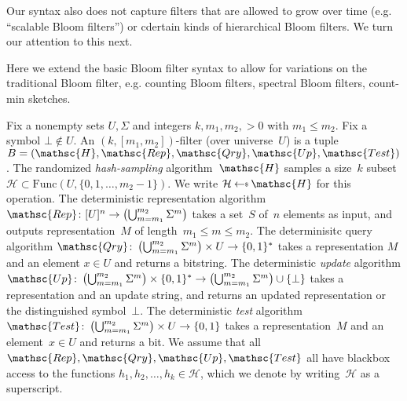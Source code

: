 Our syntax also does not capture filters that are allowed to grow over time (e.g. ``scalable Bloom filters'') or cdertain kinds of hierarchical Bloom filters.  We turn our attention to this next.


Here we extend the basic Bloom filter syntax to allow for variations on the traditional Bloom filter, e.g. counting Bloom filters, spectral Bloom filters, count-min sketches.  

Fix a nonempty sets $U,\Sigma$ and integers $k,m_1,m_2,>0$ with $m_1 \leq m_2$.  Fix a symbol $\bot \not\in U$.  An $(k,[m_1,m_2])$-filter (over universe~$U$) is a tuple  $B=(\mathsc{H},\mathsc{Rep},\mathsc{Qry},\mathsc{Up}, \mathsc{Test})$.   
%
The randomized \emph{hash-sampling} algorithm~$\mathsc{H}$ samples a size~$k$ subset~$\mathcal{H} \subset \mathrm{Func}(U,\{0,1,\ldots,m_2-1\})$.  We write $\mathcal{H} \getsr \mathsc{H}$ for this operation.
%
The deterministic representation algorithm $\mathsc{Rep}\colon [U]^n \rightarrow \left(\bigcup_{m=m_1}^{m_2}\Sigma^m\right)$ takes a set~$S$ of~$n$ elements as input, and outputs representation~$M$ of length~$m_1 \leq m \leq m_2$.
%
The determinisitc query algorithm $\mathsc{Qry}\colon \left(\bigcup_{m=m_1}^{m_2}\Sigma^m \right)\times U \rightarrow \bits^*$ takes a representation $M$ and an element $x \in U$ and returns a bitstring.  
%
The deterministic \emph{update} algorithm $\mathsc{Up}\colon \left(\bigcup_{m=m_1}^{m_2}\Sigma^m \right)\times \bits^* \rightarrow \left(\bigcup_{m=m_1}^{m_2}\Sigma^m \right) \cup \{\bot\}$ takes a representation and an update string, and returns an updated representation or the distinguished symbol~$\bot$. 
%
The deterministic \emph{test} algorithm $\mathsc{Test} \colon \left(\bigcup_{m=m_1}^{m_2}\Sigma^m \right) \times U \rightarrow \bits$ takes a representation~$M$ and an element~$x \in U$ and returns a bit.
%
We assume that all $\mathsc{Rep},\mathsc{Qry},\mathsc{Up},\mathsc{Test}$ all have blackbox access to the functions $h_1,h_2,\ldots,h_k \in \mathcal{H}$, which we denote by writing~$\mathcal{H}$ as a superscript.   





